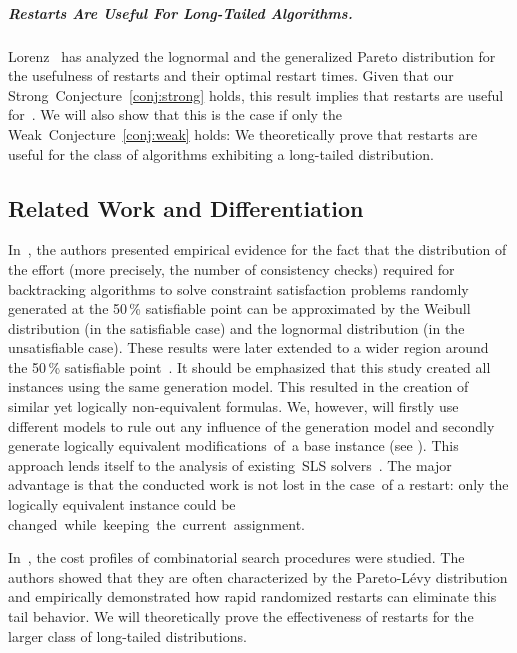 \subparagraph*{Restarts Are Useful For Long-Tailed Algorithms.}

Lorenz~\cite{Lorenz18RuntimeDistributions} has analyzed
the lognormal and the generalized Pareto distribution
for the usefulness of restarts and their optimal restart times.
Given that our Strong~Conjecture~\ref{conj:strong} holds, this result implies that restarts are useful for~\Alfa{}.
We will also show that this is the case if only the Weak~Conjecture~\ref{conj:weak} holds: We theoretically prove that restarts are useful for the class of algorithms exhibiting a long-tailed distribution.


\subsection{Related Work and Differentiation}




In~\cite{FRV97SummarizingCSPHardness}, the authors presented empirical evidence for the fact that the distribution of the effort (more precisely, the number of consistency checks) required for backtracking algorithms to solve constraint satisfaction problems randomly generated at the 50\,\% satisfiable point can be approximated by the Weibull distribution (in the satisfiable case) and the lognormal distribution (in the unsatisfiable case).
These results were later extended to a wider region around the 50\,\% satisfiable point~\cite{RF97StatisticalAnalysis}.
It should be emphasized that this study created all instances using the same generation model. This resulted in the creation of similar yet logically non-equivalent formulas.
We, however, will firstly use different models to rule out any influence of the generation model and secondly generate logically equivalent modifications~of~a base instance (see ).
This approach lends itself to the analysis of existing~SLS solvers~\cite{LW20OnTheEffectOfLearnedClauses}.
The major advantage is that the conducted work is not lost in the case~of a restart: only the logically equivalent instance could be \mbox{changed while keeping the current assignment}.


In~\cite{GSCK00HeavyTailedPhenomena}, the cost profiles of combinatorial search procedures were studied. 
The authors showed 
that 
they
are often characterized by %
the
Pareto-Lévy distribution %
and %
empirically demonstrated
how rapid randomized restarts can 
eliminate %
this tail behavior.
We will theoretically prove the effectiveness of restarts for the larger class of long-tailed distributions.




